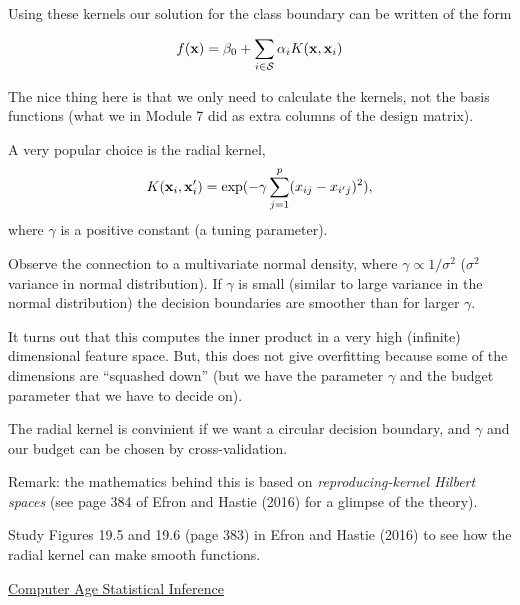 \documentclass[ignorenonframetext,]{beamer}
\begin{document}
\begin{frame}

Using these kernels our solution for the class boundary can be written
of the form

\[f({\bf x})=\beta_0 +\sum_{i\in \cal{S}} \alpha_i K({\bf x},{\bf x}_i)\]

The nice thing here is that we only need to calculate the kernels, not
the basis functions (what we in Module 7 did as extra columns of the
design matrix).

\end{frame}

\begin{frame}

A very popular choice is the radial kernel, \[
K({\bf x}_i,{\bf x}_i')=\exp(-\gamma \sum_{j=1}^p (x_{ij}-x_{i'j})^2),
\] where \(\gamma\) is a positive constant (a tuning parameter).

Observe the connection to a multivariate normal density, where
\(\gamma \propto 1/\sigma^2\) (\(\sigma^2\) variance in normal
distribution). If \(\gamma\) is small (similar to large variance in the
normal distribution) the decision boundaries are smoother than for
larger \(\gamma\).

It turns out that this computes the inner product in a very high
(infinite) dimensional feature space. But, this does not give
overfitting because some of the dimensions are ``squashed down'' (but we
have the parameter \(\gamma\) and the budget parameter that we have to
decide on).

The radial kernel is convinient if we want a circular decision boundary,
and \(\gamma\) and our budget can be chosen by cross-validation.

Remark: the mathematics behind this is based on \emph{reproducing-kernel
Hilbert spaces} (see page 384 of Efron and Hastie (2016) for a glimpse
of the theory).

\end{frame}

\begin{frame}

Study Figures 19.5 and 19.6 (page 383) in Efron and Hastie (2016) to see
how the radial kernel can make smooth functions.

\href{https://web.stanford.edu/~hastie/CASI_files/PDF/casi.pdf}{Computer
Age Statistical Inference}

\end{frame}
\end{document}
